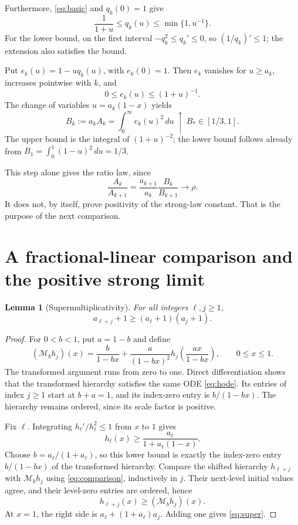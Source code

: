 \documentclass[11pt,a4paper]{article}
\newtheorem{lemma}[theorem]{Lemma}
\theoremstyle{remark}\newtheorem{remark}[theorem]{Remark}
\begin{document}
Furthermore, \eqref{eq:basic} and $q_k(0)=1$ give
\begin{equation}\label{eq:qbound}
\frac1{1+u}\le q_k(u)\le\min\{1,u^{-1}\}.
\end{equation}
For the lower bound, on the first interval $-q_k^2\le q_k'\le0$, so $(1/q_k)'\le1$; the extension also satisfies the bound.

Put $e_k(u)=1-uq_k(u)$, with $e_k(0)=1$. Then $e_k$ vanishes for $u\ge a_k$, increases pointwise with $k$, and
\[
0\le e_k(u)\le(1+u)^{-1}.
\]
The change of variables $u=a_k(1-x)$ yields
\begin{equation}\label{eq:B}
B_k:=a_kA_k=\int_0^\infty e_k(u)^2\,du
\ \uparrow\ B_*\in[1/3,1].
\end{equation}
The upper bound is the integral of $(1+u)^{-2}$; the lower bound follows already from $B_1=\int_0^1(1-u)^2\,du=1/3$.

This step alone gives the ratio law, since
\[
\frac{A_k}{A_{k+1}}=\frac{a_{k+1}}{a_k}\frac{B_k}{B_{k+1}}\longrightarrow\rho.
\]
It does not, by itself, prove positivity of the strong-law constant. That is the purpose of the next comparison.

\section{A fractional-linear comparison and the positive strong limit}
\begin{lemma}[Supermultiplicativity]\label{lem:super}
For all integers $\ell,j\ge1$,
\begin{equation}\label{eq:super}
a_{\ell+j}+1\ge(a_\ell+1)(a_j+1).
\end{equation}
\end{lemma}
\begin{proof}
For $0<b<1$, put $a=1-b$ and define
\begin{equation}\label{eq:mobius}
(\mathcal M_b h_j)(x)
=\frac b{1-bx}+\frac a{(1-bx)^2}
 h_j\!\left(\frac{ax}{1-bx}\right),\qquad 0\le x\le1.
\end{equation}
The transformed argument runs from zero to one. Direct differentiation shows that the transformed hierarchy satisfies the same ODE \eqref{eq:hode}. Its entries of index $j\ge1$ start at $b+a=1$, and its index-zero entry is $b/(1-bx)$. The hierarchy remains ordered, since its scale factor is positive.

Fix $\ell$. Integrating $h_\ell'/h_\ell^2\le1$ from $x$ to $1$ gives
\[
h_\ell(x)\ge\frac{a_\ell}{1+a_\ell(1-x)}.
\]
Choose $b=a_\ell/(1+a_\ell)$, so this lower bound is exactly the index-zero entry $b/(1-bx)$ of the transformed hierarchy. Compare the shifted hierarchy $h_{\ell+j}$ with $\mathcal M_b h_j$ using \eqref{eq:comparison}, inductively in $j$. Their next-level initial values agree, and their level-zero entries are ordered, hence
\[
h_{\ell+j}(x)\ge(\mathcal M_bh_j)(x).
\]
At $x=1$, the right side is $a_\ell+(1+a_\ell)a_j$. Adding one gives \eqref{eq:super}.
\end{proof}
\end{document}

